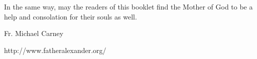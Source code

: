 In the same way, may the readers of this booklet find the Mother of God to be a help and consolation for their souls as well.

Fr. Michael Carney

http://www.fatheralexander.org/

\vfill



\endgroup

\vfill
